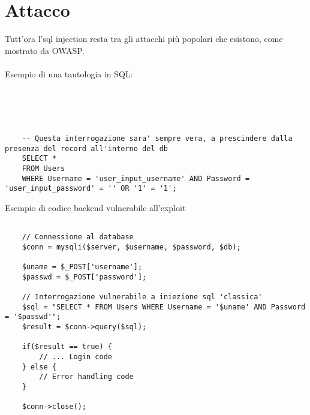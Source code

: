 \documentclass{book}
\begin{document}
\section{Attacco}
Tutt'ora l'sql injection resta tra gli attacchi più popolari che esistono, come mostrato da OWASP.
\\
\\
Esempio di una tautologia in SQL:
\\
\\
\\
\\
\begin{lstlisting}
    
    -- Questa interrogazione sara' sempre vera, a prescindere dalla presenza del record all'interno del db
    SELECT * 
    FROM Users 
    WHERE Username = 'user_input_username' AND Password = 'user_input_password' = '' OR '1' = '1';

\end{lstlisting}
Esempio di codice backend vulnerabile all'exploit

\begin{lstlisting}
    
    // Connessione al database
    $conn = mysqli($server, $username, $password, $db);

    $uname = $_POST['username'];
    $passwd = $_POST['password'];

    // Interrogazione vulnerabile a iniezione sql 'classica'
    $sql = "SELECT * FROM Users WHERE Username = '$uname' AND Password = '$passwd'";
    $result = $conn->query($sql);

    if($result == true) {
        // ... Login code
    } else {
        // Error handling code
    }

    $conn->close();

\end{lstlisting}
\end{document}
